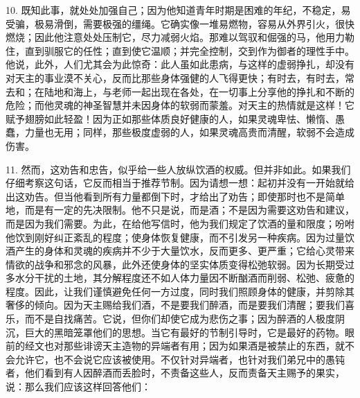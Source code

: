 10. 既知此事，就处处加强自己；因为他知道青年时期是困难的年纪，不稳定，易受骗，极易滑倒，需要极强的缰绳。它确实像一堆易燃物，容易从外界引火，很快燃烧；因此他注意处处压制它，尽力减弱火焰。那难以驾驭和倔强的马，他用力勒住，直到驯服它的任性；直到使它温顺；并完全控制，交到作为御者的理性手中。他说，此外，人们尤其会为此惊奇：此人虽如此患病，与这样的虚弱挣扎，却没有对天主的事业漠不关心，反而比那些身体强健的人飞得更快；有时去，有时去，常去和；在陆地和海上，与老师一起出现在各处，在一切事上分享他的挣扎和不断的危险；而他灵魂的神圣智慧并未因身体的软弱而蒙羞。对天主的热情就是这样！它赋予翅膀如此轻盈！因为正如那些体质良好健康的人，如果灵魂卑怯、懒惰、愚蠢，力量也无用；同样，那些极度虚弱的人，如果灵魂高贵而清醒，软弱不会造成伤害。\par

11. 然而，这劝告和忠告，似乎给一些人放纵饮酒的权威。但并非如此。如果我们仔细考察这句话，它反而相当于推荐节制。因为请想一想：起初并没有一开始就给出这劝告。但当他看到所有力量都倒下时，才给出了劝告；即使那时也不是简单地，而是有一定的先决限制。他不只是说，而是酒；不是因为需要这劝告和建议，而是因为我们需要。为此，在给他写信时，他为我们规定了饮酒的量和限度；吩咐他饮到刚好纠正紊乱的程度；使身体恢复健康，而不引发另一种疾病。因为过量饮酒产生的身体和灵魂的疾病并不少于大量饮水，反而更多、更严重；它给心灵带来情欲的战争和邪念的风暴，此外还使身体的坚实体质变得松弛软弱。因为长期受过多水分干扰的土地，其分解程度还不如人体力量因不断酗酒而削弱、松弛、疲惫的程度。因此，让我们谨慎避免任何一方过度，同时我们照顾身体的健康，并剪除其奢侈的倾向。因为天主赐给我们酒，不是要我们醉酒，而是要我们清醒；要我们喜乐，而不是自找痛苦。它说，但你们却使它成为悲伤之事；因为醉酒的人极度阴沉，巨大的黑暗笼罩他们的思想。当它有最好的节制引导时，它是最好的药物。眼前的经文也对那些诽谤天主造物的异端者有用；因为如果酒是被禁止的东西，就不会允许它，也不会说它应该被使用。不仅针对异端者，也针对我们弟兄中的愚钝者，他们看到有人因醉酒而丢脸时，不责备这些人，反而责备天主赐予的果实，说：那么我们应该这样回答他们：\par

